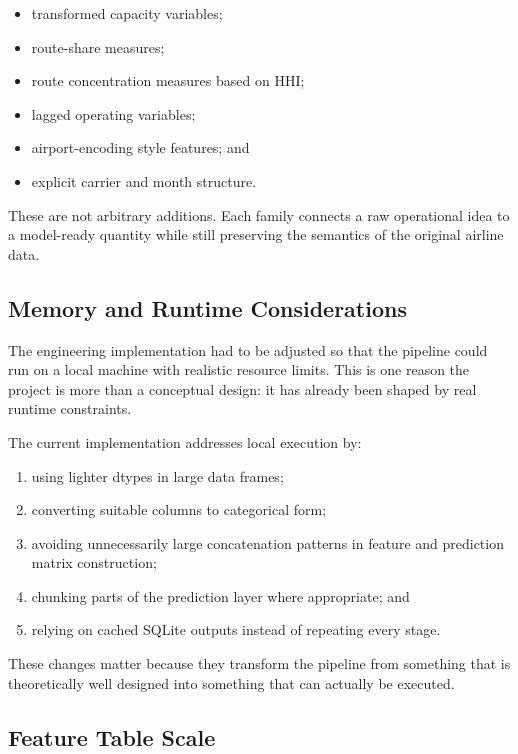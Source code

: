 \documentclass[11pt,a4paper]{article}
\begin{document}
\begin{itemize}[leftmargin=*]
  \item transformed capacity variables;
  \item route-share measures;
  \item route concentration measures based on HHI;
  \item lagged operating variables;
  \item airport-encoding style features; and
  \item explicit carrier and month structure.
\end{itemize}

These are not arbitrary additions. Each family connects a raw operational idea
to a model-ready quantity while still preserving the semantics of the original
airline data.

\subsection{Memory and Runtime Considerations}

The engineering implementation had to be adjusted so that the pipeline could
run on a local machine with realistic resource limits. This is one reason the
project is more than a conceptual design: it has already been shaped by real
runtime constraints.

The current implementation addresses local execution by:

\begin{enumerate}[leftmargin=*, label=(\arabic*)]
  \item using lighter dtypes in large data frames;
  \item converting suitable columns to categorical form;
  \item avoiding unnecessarily large concatenation patterns in feature and
  prediction matrix construction;
  \item chunking parts of the prediction layer where appropriate; and
  \item relying on cached SQLite outputs instead of repeating every stage.
\end{enumerate}

These changes matter because they transform the pipeline from something that is
theoretically well designed into something that can actually be executed.

\subsection{Feature Table Scale}
\end{document}
